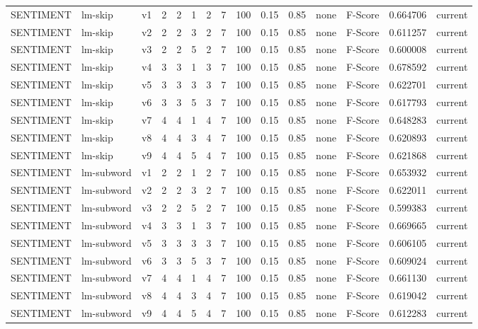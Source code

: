 \documentclass{article}
\begin{document}
\begin{xltabular}{\linewidth}{@{}lYcrrrrrrrrYlrl@{}}
SENTIMENT & lm-skip & v1 & 2 & 2 & 1 & 2 & 7 & 100 & 0.15 & 0.85 & none & F-Score & 0.664706 & current \\
SENTIMENT & lm-skip & v2 & 2 & 2 & 3 & 2 & 7 & 100 & 0.15 & 0.85 & none & F-Score & 0.611257 & current \\
SENTIMENT & lm-skip & v3 & 2 & 2 & 5 & 2 & 7 & 100 & 0.15 & 0.85 & none & F-Score & 0.600008 & current \\
SENTIMENT & lm-skip & v4 & 3 & 3 & 1 & 3 & 7 & 100 & 0.15 & 0.85 & none & F-Score & 0.678592 & current \\
SENTIMENT & lm-skip & v5 & 3 & 3 & 3 & 3 & 7 & 100 & 0.15 & 0.85 & none & F-Score & 0.622701 & current \\
SENTIMENT & lm-skip & v6 & 3 & 3 & 5 & 3 & 7 & 100 & 0.15 & 0.85 & none & F-Score & 0.617793 & current \\
SENTIMENT & lm-skip & v7 & 4 & 4 & 1 & 4 & 7 & 100 & 0.15 & 0.85 & none & F-Score & 0.648283 & current \\
SENTIMENT & lm-skip & v8 & 4 & 4 & 3 & 4 & 7 & 100 & 0.15 & 0.85 & none & F-Score & 0.620893 & current \\
SENTIMENT & lm-skip & v9 & 4 & 4 & 5 & 4 & 7 & 100 & 0.15 & 0.85 & none & F-Score & 0.621868 & current \\
SENTIMENT & lm-subword & v1 & 2 & 2 & 1 & 2 & 7 & 100 & 0.15 & 0.85 & none & F-Score & 0.653932 & current \\
SENTIMENT & lm-subword & v2 & 2 & 2 & 3 & 2 & 7 & 100 & 0.15 & 0.85 & none & F-Score & 0.622011 & current \\
SENTIMENT & lm-subword & v3 & 2 & 2 & 5 & 2 & 7 & 100 & 0.15 & 0.85 & none & F-Score & 0.599383 & current \\
SENTIMENT & lm-subword & v4 & 3 & 3 & 1 & 3 & 7 & 100 & 0.15 & 0.85 & none & F-Score & 0.669665 & current \\
SENTIMENT & lm-subword & v5 & 3 & 3 & 3 & 3 & 7 & 100 & 0.15 & 0.85 & none & F-Score & 0.606105 & current \\
SENTIMENT & lm-subword & v6 & 3 & 3 & 5 & 3 & 7 & 100 & 0.15 & 0.85 & none & F-Score & 0.609024 & current \\
SENTIMENT & lm-subword & v7 & 4 & 4 & 1 & 4 & 7 & 100 & 0.15 & 0.85 & none & F-Score & 0.661130 & current \\
SENTIMENT & lm-subword & v8 & 4 & 4 & 3 & 4 & 7 & 100 & 0.15 & 0.85 & none & F-Score & 0.619042 & current \\
SENTIMENT & lm-subword & v9 & 4 & 4 & 5 & 4 & 7 & 100 & 0.15 & 0.85 & none & F-Score & 0.612283 & current \\

\end{xltabular}
\end{document}

